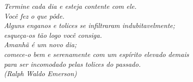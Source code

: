 \begin{epigrafe}
    \vspace*{\fill}
	\begin{flushright}
		\textit{Termine cada dia e esteja contente com ele. \\
		Você fez o que pôde. \\
		Alguns enganos e tolices se infiltraram indubitavelmente; \\
		esqueça-os tão logo você consiga. \\
		Amanhã é um novo dia; \\
		comece-o bem e serenamente com um espírito elevado demais \\
		para ser incomodado pelas tolices do passado.\\
		(Ralph Waldo Emerson)}

	\end{flushright}
\end{epigrafe}
